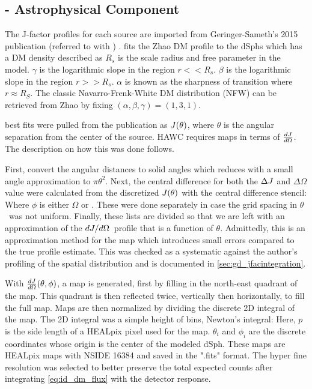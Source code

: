 \subsection{\J - Astrophysical Component}\label{sec:gd_spatialmodel}

The J-factor profiles for each source are imported from Geringer-Sameth's 2015 publication (referred to with \GS) \cite{Geringer_Sameth_2015}.
\GS fits the Zhao DM profile to the dSphs which has a DM density described as \cite{Zhao:1995cp}
\zhaoProfile
$R_s$ is the scale radius and free parameter in the model.
$\gamma$ is the logarithmic slope in the region $r << R_s$.
$\beta$ is the logarithmic slope in the region $r >> R_s$.
$\alpha$ is known as the sharpness of transition where $r \approx R_S$.
The classic Navarro-Frenk-White DM distribution \cite{NFWProfile} (NFW) can be retrieved from Zhao by fixing $(\alpha, \beta, \gamma) = (1,3,1)$.

\GS best fits were pulled from the publication as $J(\theta)$, where $\theta$ is the angular separation from the center of the source.
HAWC requires maps in terms of $\frac{dJ}{d\Omega}$.
The description on how this was done follows.

First, convert the angular distances to solid angles
\angleTOsolidangle
which reduces with a small angle approximation to $\pi \theta^2$.
Next, the central difference for both the $\Delta J$ and $\Delta \Omega$ value were calculated from the discretized $J(\theta)$ with the central difference stencil:
\centerDiff
Where $\phi$ is either $\Omega$ or \J.
These were done separately in case the grid spacing in $\theta$~was not uniform.
Finally, these lists are divided so that we are left with an approximation of the $dJ/d\Omega$~profile that is a function of $\theta$.
Admittedly, this is an approximation method for the map which introduces small errors compared to the true profile estimate.
This was checked as a systematic against the author's profiling of the spatial distribution and is documented in \cref{sec:gd_jfacintegration}.

With $\frac{dJ}{d\Omega}(\theta, \phi)$, a map is generated, first by filling in the north-east quadrant of the map.
This quadrant is then reflected twice, vertically then horizontally, to fill the full map.
Maps are then normalized by dividing the discrete 2D integral of the map.
The 2D integral was a simple height of bins, Newton's integral:
\newtonIntegral
Here, $p$ is the side length of a HEALpix pixel used for the map.
$\theta_i$ and $\phi_i$ are the discrete coordinates whose origin is the center of the modeled dSph.
These maps are HEALpix maps with NSIDE 16384 and saved in the ".fits" format.
The hyper fine resolution was selected to better preserve the total expected counts after integrating \cref{eq:id_dm_flux} with the detector response.

